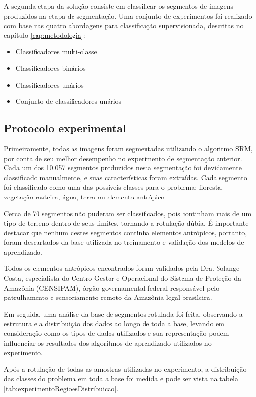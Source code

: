 A segunda etapa da solução consiste em classificar os segmentos de imagens produzidos na etapa de segmentação. Uma conjunto de experimentos foi realizado com base nas quatro abordagens para classificação supervisionada, descritas no capítulo \ref{cap:metodologia}:

\begin{itemize}
	\item Classificadores multi-classe
	\item Classificadores binários
	\item Classificadores unários
	\item Conjunto de classificadores unários
\end{itemize}

\subsection{Protocolo experimental}

Primeiramente, todas as imagens foram segmentadas utilizando o algoritmo SRM, por conta de seu melhor desempenho no experimento de segmentação anterior. Cada um dos 10.057 segmentos produzidos nesta segmentação foi devidamente classificado manualmente, e suas características foram extraídas. Cada segmento foi classificado como uma das possíveis classes para o problema: floresta, vegetação rasteira, água, terra ou elemento antrópico.

Cerca de 70 segmentos não puderam ser classificados, pois continham mais de um tipo de terreno dentro de seus limites, tornando a rotulação dúbia. É importante destacar que nenhum destes segmentos continha elementos antrópicos, portanto, foram descartados da base utilizada no treinamento e validação dos modelos de aprendizado.

Todos os elementos antrópicos encontrados foram validados pela Dra. Solange Costa, especialista do Centro Gestor e Operacional do Sistema de Proteção da Amazônia (CENSIPAM), órgão governamental federal responsável pelo patrulhamento e sensoriamento remoto da Amazônia legal brasileira.

Em seguida, uma análise da base de segmentos rotulada foi feita, observando a estrutura e a distribuição dos dados ao longo de toda a base, levando em consideração como os tipos de dados utilizados e sua representação podem influenciar os resultados dos algoritmos de aprendizado utilizados no experimento.

Após a rotulação de todas as amostras utilizadas no experimento, a distribuição das classes do problema em toda a base foi medida e pode ser vista na tabela \ref{tab:experimentoRegioesDistribuicao}.

